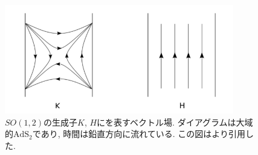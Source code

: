 \begin{figure}[ht]
	\centering
	\includegraphics[width=10cm]{figures/time_translation}
	\caption{$SO(1,2)$の生成子$K$, $H$にを表すベクトル場. ダイアグラムは大域的$\mathrm{AdS}_2$であり, 
		時間は鉛直方向に流れている. この図は\cite{stanford_chaos}より引用した. 
	}
	\label{fig:time_translation}
\end{figure}

